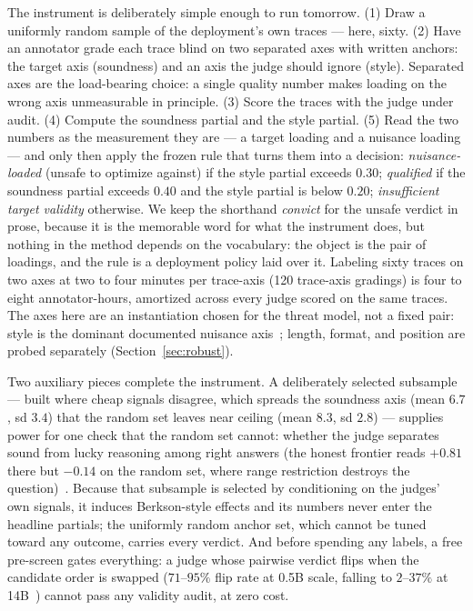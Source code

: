 \documentclass[11pt]{article}
\begin{document}
The instrument is deliberately simple enough to run tomorrow.
(1) Draw a uniformly random sample of the deployment's own traces --- here, sixty.
(2) Have an annotator grade each trace blind on two separated axes with written anchors: the target axis (soundness) and an axis the judge should ignore (style).
Separated axes are the load-bearing choice: a single quality number makes loading on the wrong axis unmeasurable in principle.
(3) Score the traces with the judge under audit.
(4) Compute the soundness partial and the style partial.
(5) Read the two numbers as the measurement they are --- a target loading and a nuisance loading --- and only then apply the frozen rule that turns them into a decision: \emph{nuisance-loaded} (unsafe to optimize against) if the style partial exceeds $0.30$; \emph{qualified} if the soundness partial exceeds $0.40$ and the style partial is below $0.20$; \emph{insufficient target validity} otherwise.
We keep the shorthand \emph{convict} for the unsafe verdict in prose, because it is the memorable word for what the instrument does, but nothing in the method depends on the vocabulary: the object is the pair of loadings, and the rule is a deployment policy laid over it.
Labeling sixty traces on two axes at two to four minutes per trace-axis (120 trace-axis gradings) is four to eight annotator-hours, amortized across every judge scored on the same traces.
The axes here are an instantiation chosen for the threat model, not a fixed pair: style is the dominant documented nuisance axis~\cite{wu2023style,rmbench2024}; length, format, and position are probed separately (Section~\ref{sec:robust}).

Two auxiliary pieces complete the instrument.
A deliberately selected subsample --- built where cheap signals disagree, which spreads the soundness axis (mean $6.7$, sd $3.4$) that the random set leaves near ceiling (mean $8.3$, sd $2.8$) --- supplies power for one check that the random set cannot: whether the judge separates sound from lucky reasoning among right answers (the honest frontier reads $+0.81$ there but $-0.14$ on the random set, where range restriction destroys the question)~\cite{companionB}.
Because that subsample is selected by conditioning on the judges' own signals, it induces Berkson-style effects and its numbers never enter the headline partials; the uniformly random anchor set, which cannot be tuned toward any outcome, carries every verdict.
And before spending any labels, a free pre-screen gates everything: a judge whose pairwise verdict flips when the candidate order is swapped ($71$--$95\%$ flip rate at 0.5B scale, falling to $2$--$37\%$ at 14B~\cite{companionB}) cannot pass any validity audit, at zero cost.
\end{document}
